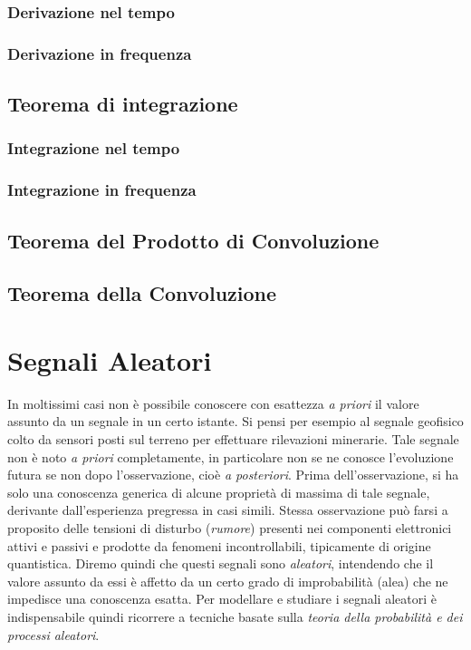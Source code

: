 \documentclass[12pt,oneside,openany]{memoir}
\numberwithin{equation}{subsection}
\begin{document}
\subsubsection{Derivazione nel tempo}
\newpage
\subsubsection{Derivazione in frequenza}

\newpage
\subsection{Teorema di integrazione}
\newpage
\subsubsection{Integrazione nel tempo}
\newpage
\subsubsection{Integrazione in frequenza}

\newpage
\subsection{Teorema del Prodotto di Convoluzione}

\newpage
\subsection{Teorema della Convoluzione}

\newpage	
\section{Segnali Aleatori}
In moltissimi casi non \`e possibile conoscere con esattezza \textit{a priori} il valore assunto da un segnale in un certo istante. Si pensi per esempio al segnale geofisico colto da sensori posti sul terreno per effettuare rilevazioni minerarie. Tale segnale non \`e noto \textit{a priori} completamente, in particolare non se ne conosce l'evoluzione futura se non dopo l'osservazione, cio\`e \textit{a posteriori}. Prima dell'osservazione, si ha solo una conoscenza generica di alcune propriet\`a di massima di tale segnale, derivante dall'esperienza pregressa in casi simili. Stessa osservazione pu\`o farsi a proposito delle tensioni di disturbo (\textit{rumore}) presenti nei componenti elettronici attivi e passivi e prodotte da fenomeni incontrollabili, tipicamente di origine quantistica. Diremo quindi che questi segnali sono \textit{aleatori}, intendendo che il valore assunto da essi \`e affetto da un certo grado di improbabilit\`a (alea) che ne impedisce una conoscenza esatta. 
Per modellare e studiare i segnali aleatori \`e indispensabile quindi ricorrere a tecniche basate sulla \textit{teoria della probabilit\`a e dei processi aleatori}.
\end{document}
